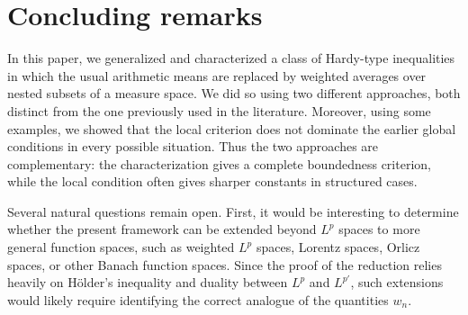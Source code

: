 \documentclass[oneside,10pt]{article}          %
\numberwithin{equation}{section}
\begin{document}
\section{Concluding remarks}\label{sec - conclusion}


In this paper, we generalized and characterized a class of Hardy-type inequalities in which the usual arithmetic means are replaced by weighted averages over nested subsets of a measure space. We did so using two different approaches, both distinct from the one previously used in the literature. 
Moreover, using some examples, we showed that the local criterion does not dominate the earlier global conditions in every possible situation. Thus the two approaches are complementary: the characterization gives a complete boundedness criterion, while the local condition often gives sharper constants in structured cases. 

Several natural questions remain open. First, it would be interesting to determine whether the present framework can be extended beyond $L^p$ spaces to more general function spaces, such as weighted $L^p$ spaces, Lorentz spaces, Orlicz spaces, or other Banach function spaces. Since the proof of the reduction relies heavily on Hölder's inequality and duality between $L^p$ and $L^{p'}$, such extensions would likely require identifying the correct analogue of the quantities $w_n$. 
\end{document}
